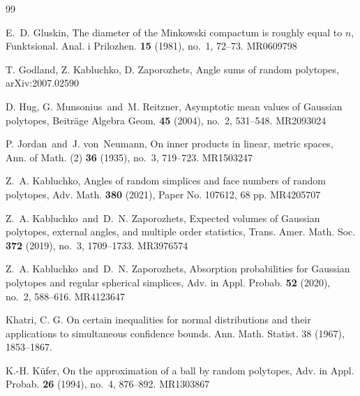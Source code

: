 \documentclass[11pt]{amsart}
\theoremstyle{definition}
\theoremstyle{plain}
\begin{document}
\begin{thebibliography}{99}

{
E.~D. Gluskin, The diameter of the Minkowski compactum is roughly equal to $n$, Funktsional. Anal. i Prilozhen. {\bf 15} (1981), no.~1, 72--73. MR0609798
}

{
T. Godland, Z. Kabluchko, D. Zaporozhets,
Angle sums of random polytopes,
arXiv:2007.02590
}


{
D. Hug, G. Munsonius\ and\ M. Reitzner, Asymptotic mean values of Gaussian polytopes, Beitr\"{a}ge Algebra Geom. {\bf 45} (2004), no.~2, 531--548. MR2093024
}

{
P. Jordan\ and\ J. von~Neumann, On inner products in linear, metric spaces, Ann. of Math. (2) {\bf 36} (1935), no.~3, 719--723. MR1503247
}

{
Z.~A. Kabluchko, Angles of random simplices and face numbers of random polytopes, Adv. Math. {\bf 380} (2021), Paper No. 107612, 68 pp. MR4205707
}

{
Z.~A. Kabluchko\ and\ D.~N. Zaporozhets, Expected volumes of Gaussian polytopes, external angles, and multiple order statistics, Trans. Amer. Math. Soc. {\bf 372} (2019), no.~3, 1709--1733. MR3976574
}

{
Z.~A. Kabluchko\ and\ D.~N. Zaporozhets, Absorption probabilities for Gaussian polytopes and regular spherical simplices, Adv. in Appl. Probab. {\bf 52} (2020), no.~2, 588--616. MR4123647
}


{
Khatri, C. G. On certain inequalities for normal distributions and their applications to simultaneous confidence bounds. Ann. Math. Statist. 38 (1967), 1853--1867.
}


{
K.-H. K\"{u}fer, On the approximation of a ball by random polytopes, Adv. in Appl. Probab. {\bf 26} (1994), no.~4, 876--892. MR1303867
}


\end{thebibliography}
\end{document}
